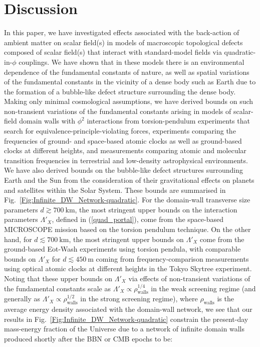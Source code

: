 \documentclass[aps,prd,onecolumn,nofootinbib]{revtex4-2} %
\begin{document}
\section{Discussion}
\label{Sec:Discussion}
In this paper, we have investigated effects associated with the back-action of ambient matter on scalar field(s) in models of macroscopic topological defects composed of scalar field(s) that interact with standard-model fields via quadratic-in-$\phi$ couplings. 
We have shown that in these models there is an environmental dependence of the fundamental constants of nature, as well as spatial variations of the fundamental constants in the vicinity of a dense body such as Earth due to the formation of a bubble-like defect structure surrounding the dense body. 
Making only minimal cosmological assumptions, we have derived bounds on such non-transient variations of the fundamental constants arising in models of scalar-field domain walls with $\phi^2$ interactions from torsion-pendulum experiments that search for equivalence-principle-violating forces, experiments comparing the frequencies of ground- and space-based atomic clocks as well as ground-based clocks at different heights, and measurements comparing atomic and molecular transition frequencies in terrestrial and low-density astrophysical environments. 
We have also derived bounds on the bubble-like defect structures surrounding Earth and the Sun from the consideration of their gravitational effects on planets and satellites within the Solar System. 
These bounds are summarised in Fig.~\ref{Fig:Infinite_DW_Network-quadratic}. 
For the domain-wall transverse size parameters $d \gtrsim 700~\textrm{km}$, the most stringent upper bounds on the interaction parameters $\Lambda'_X$, defined in (\ref{quad_portal}), come from the space-based MICROSCOPE mission based on the torsion pendulum technique. 
On the other hand, for $d \lesssim 700~\textrm{km}$, the most stringent upper bounds on $\Lambda'_X$ come from the ground-based E$\ddot{\textrm{o}}$t-Wash experiments using torsion pendula, with comparable bounds on $\Lambda'_{X}$ for $d \lesssim 450~\textrm{m}$ coming from frequency-comparison measurements using optical atomic clocks at different heights in the Tokyo Skytree experiment. 
Noting that these upper bounds on $\Lambda'_X$ via effects of non-transient variations of the fundamental constants scale as $\Lambda'_X \propto \rho_\textrm{walls}^{1/4}$ in the weak screening regime (and generally as $\Lambda'_X \propto \rho_\textrm{walls}^{1/2}$ in the strong screening regime), where $\rho_\textrm{walls}$ is the average energy density associated with the domain-wall network, we see that our results in Fig.~\ref{Fig:Infinite_DW_Network-quadratic} constrain the present-day mass-energy fraction of the Universe due to a network of infinite domain walls produced shortly after the BBN or CMB epochs to be: 
\end{document}

